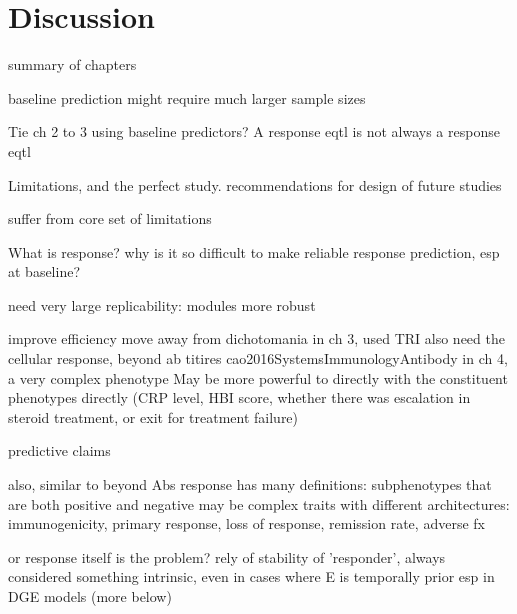%
%

\chapter{Discussion}
\label{chap:discussion}

\begin{outline}

summary of chapters

    baseline prediction might require much larger sample sizes

    Tie ch 2 to 3 using baseline predictors?
    A response eqtl is not always a response eqtl

    Limitations, and the perfect study.
        recommendations for design of future studies

    suffer from core set of limitations 

What is response?
why is it so difficult to make reliable response prediction, esp at baseline?

    need very large 
        replicability: modules more robust


    improve efficiency
        move away from dichotomania
            in ch 3, used TRI
                also need the cellular response, beyond ab titires cao2016SystemsImmunologyAntibody
            in ch 4, 
                a very complex phenotype
                May be more powerful to directly with the constituent phenotypes directly (CRP level, HBI score, whether there was escalation in steroid treatment, or exit for treatment failure)

                predictive claims

                also, similar to beyond Abs
                response has many definitions: subphenotypes that are both positive and negative may be complex traits with different architectures: immunogenicity, primary response, loss of response, remission rate, adverse fx

    or response itself is the problem?
        rely of stability of 'responder', 
            always considered something intrinsic, even in cases where E is temporally prior
            esp in DGE models (more below)
            

\end{outline}
